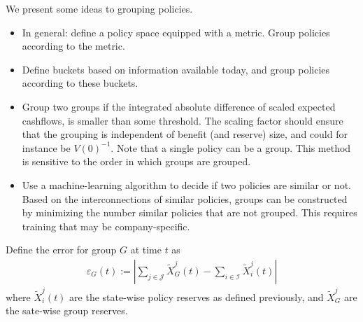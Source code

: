 \documentclass[12pt]{article}
\begin{document}
We present some ideas to grouping policies.
\begin{itemize}
\item In general: define a policy space equipped with a metric. Group policies according to the metric.
\item Define buckets based on information available today, and group policies according to these buckets.
\item Group two groups if the integrated absolute difference of scaled expected cashflows, is smaller than some threshold. The scaling factor should ensure that the grouping is independent of benefit (and reserve) size, and could for instance be $V(0)^{-1}$. Note that a single policy can be a group. This method is sensitive to the order in which groups are grouped.
\item Use a machine-learning algorithm to decide if two policies are similar or not. Based on the interconnections of similar policies, groups can be constructed by minimizing the number similar policies that are not grouped. This requires training that may be company-specific.
\end{itemize}
Define the error for group $G$ at time $t$ as
\begin{align*}
\varepsilon_G(t):=\left| \sum_{j \in \mathcal{J}} \tilde{X}^j_G(t) - \sum_{i \in \mathcal{I}} \tilde{X}^j_i(t) \right|
\end{align*}
where $\tilde{X}^j_i(t)$ are the state-wise policy reserves as defined previously, and $\tilde{X}^j_G$ are the sate-wise group reserves.


\newpage


\end{document}
